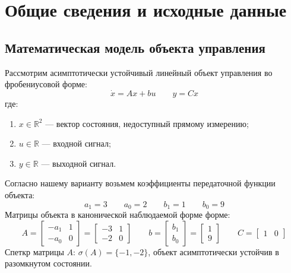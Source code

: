 \documentclass[a4paper,12pt]{article}
\begin{document}
	\newpage
	\tableofcontents
	
	
\newpage
\section{Общие сведения и исходные данные}

\subsection{Математическая модель объекта управления}
Рассмотрим асимптотически устойчивый линейный объект управления во фробениусовой форме:
\begin{equation}
	\dot{x} = Ax + bu \qquad y = Cx
	\label{eq:obj_lab6}
\end{equation}
где:

\begin{enumerate}
	\item $x \in \mathbb{R}^2$ --- вектор состояния, недоступный прямому измерению;
	\item $u \in \mathbb{R}$ --- входной сигнал;
	\item $y \in \mathbb{R}$ --- выходной сигнал.
\end{enumerate}

Согласно нашему варианту возьмем коэффициенты передаточной функции объекта: 
\[a_1 = 3 \qquad  a_0 = 2 \qquad b_1 = 1 \qquad b_0 = 9\]
Матрицы объекта в канонической наблюдаемой форме форме:
\begin{equation}
	A = \begin{bmatrix} -a_1 & 1 \\ -a_0 & 0 \end{bmatrix} = \begin{bmatrix} -3 & 1 \\ -2 & 0 \end{bmatrix} \qquad 
	b = \begin{bmatrix} b_1 \\ b_0 \end{bmatrix} = \begin{bmatrix} 1 \\ 9 \end{bmatrix} \qquad 
	C = \begin{bmatrix} 1 & 0 \end{bmatrix}
\end{equation}
Спеткр матрицы $A$: $\sigma(A) = \{-1, -2\}$, объект асимптотически устойчив в разомкнутом состоянии. 
\end{document}
